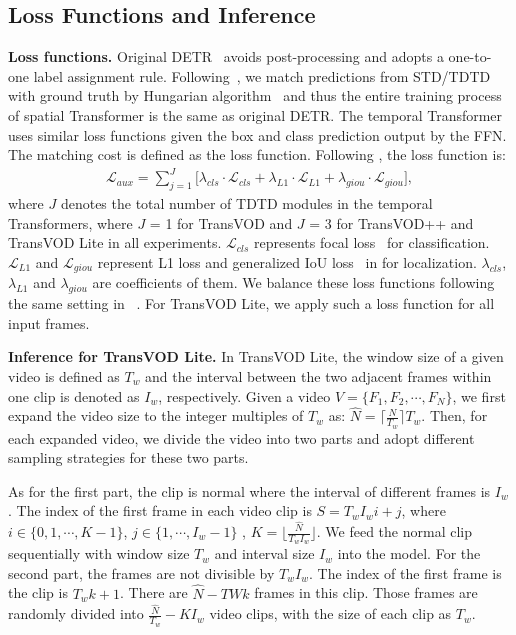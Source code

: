 \documentclass[10pt,journal,compsoc]{IEEEtran}
\begin{document}
\subsection{Loss Functions and Inference } 
\label{sec:loss_inference}
\noindent
\textbf{Loss functions.}
Original DETR~\cite{detr} avoids post-processing and adopts a one-to-one label assignment rule. Following~\cite{stewart2016end, detr, zhu2020deformable}, we match predictions from STD/TDTD with ground truth by Hungarian algorithm~\cite{kuhn1955hungarian} and thus the entire training process of spatial Transformer is the same as original DETR. 
The temporal Transformer uses similar loss functions given the box and class prediction output by the FFN. The matching cost is defined as the loss function. Following \cite{detr, zhu2020deformable, sun2021sparse}, the loss function is:
\begin{align}
    \label{eq:loss}
    \mathcal{L}_{aux} = \sum_{j=1}^{J} \big[ \lambda_{cls}\cdot\mathcal{L}_{\mathit{cls}}+\lambda_{L1} \cdot \mathcal{L}_{\mathit{L1}}+\lambda_{giou}\cdot\mathcal{L}_{\mathit{giou}} \big ],
\end{align}
where $J$ denotes the total number of TDTD modules in the temporal Transformers, where $J$ = 1 for TransVOD and $J$ = 3 for TransVOD++ and TransVOD Lite in all experiments. 
$\mathcal{L}_{\mathit{cls}}$ represents focal loss~\cite{FocalLoss} for classification. $\mathcal{L}_{\mathit{L1}}$ and $\mathcal{L}_{\mathit{giou}}$ represent L1 loss and generalized IoU loss~\cite{GIoU} in for localization. $\lambda_{cls}$, $\lambda_{L1}$ and $\lambda_{giou}$ are coefficients of them. We balance these loss functions following the same setting in ~\cite{zhu2020deformable}.
For TransVOD Lite, we apply such a loss function for all input frames.

\noindent
\textbf{Inference for TransVOD Lite.}
In TransVOD Lite, the window size of a given video is defined as $T_w$ and the interval between the two adjacent frames within one clip is denoted as $I_w$, respectively.  Given a video $V = \{F_1, F_2, \cdots, F_N\}$, we first expand the video size to the integer multiples of $T_w$ as: $\hat{N} = \lceil \frac{N}{T_w}  \rceil T_w$. Then, for each expanded video, we divide the video into two parts and adopt different sampling strategies for these two parts. 

As for the first part, the clip is normal where the interval of different frames is $I_w$.
The index of the first frame in each video clip is $S = T_wI_w i + j $, where $i \in \{ 0,1, \cdots, K -1 \}$, $j \in \{1, \cdots, I_w -1 \}$ , $K = \lfloor \frac{\hat{N}}{T_wI_w}  \rfloor $. We feed the normal clip sequentially with window size $T_w$ and interval size $I_w$ into the model. For the second part, the frames are not divisible by $T_w I_w$. The index of the first frame is the clip is $T_w k +1$. There are $\hat{N} - TW k$ frames in this clip. Those frames are randomly divided into $\frac{\hat{N}}{T_w} - KI_w$ video clips, with the size of each clip as $T_w$.  
\end{document}
